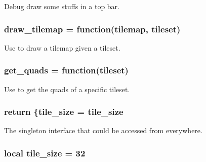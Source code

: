 Debug draw some stuffs in a top bar. 

\hypertarget{graphics_8lua_a20c63f09b77cbb8f5cff2982ce200ef4}{
\subsubsection[{draw\-\_\-tilemap}]{\setlength{\rightskip}{0pt plus 5cm}draw\-\_\-tilemap = function(tilemap, tileset)}}\label{graphics_8lua_a20c63f09b77cbb8f5cff2982ce200ef4}


Use to draw a tilemap given a tileset. 

\hypertarget{graphics_8lua_a2defc00ef60eed47fe18feeb56f113ec}{
\subsubsection[{get\-\_\-quads}]{\setlength{\rightskip}{0pt plus 5cm}get\-\_\-quads = function(tileset)}}\label{graphics_8lua_a2defc00ef60eed47fe18feeb56f113ec}


Use to get the quads of a specific tileset. 

\hypertarget{graphics_8lua_a9717e7bbecb906637e86cef6da3d83c2}{
\subsubsection[{return}]{\setlength{\rightskip}{0pt plus 5cm}return \{{\bf tile\-\_\-size} = {\bf tile\-\_\-size}}}\label{graphics_8lua_a9717e7bbecb906637e86cef6da3d83c2}


The singleton interface that could be accessed from everywhere. 

\hypertarget{graphics_8lua_aae867dcd40ede70426d25eca1e80882f}{
\subsubsection[{tile\-\_\-size}]{\setlength{\rightskip}{0pt plus 5cm}local tile\-\_\-size = 32}}\label{graphics_8lua_aae867dcd40ede70426d25eca1e80882f}
